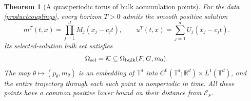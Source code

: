 \documentclass[11pt]{article}
\newtheorem{theorem}{Theorem}
\newcommand{\R}{\mathbb R}
\newcommand{\T}{\mathbb T}
\begin{document}
\begin{theorem}[A quasiperiodic torus of bulk accumulation points]
\label{quasiperiodicbulk}
For the data \eqref{productcouplings}, every horizon $T>0$ admits the
smooth positive solution
\begin{equation}\label{productspecific}
 m^T(t,x)=\prod_{j=1}^dM_j(x_j-c_jt),\qquad
 u^T(t,x)=\sum_{j=1}^dU_j(x_j-c_jt).
\end{equation}
Its selected-solution bulk set satisfies
\[
 \Omega_{\rm sel}=\mathcal K
          \subseteq\Omega_{\mathrm{bulk}}(F,G,m_0).
\]
The map $\theta\mapsto(p_\theta,m_\theta)$ is an embedding of
$\T^d$ into $C^0(\T^d;\R^d)\times L^1(\T^d)$, and the entire
trajectory through each such point is nonperiodic in time.
All these points have a common positive lower bound on their distance
from $\mathcal E_F$.
\end{theorem}
\end{document}
